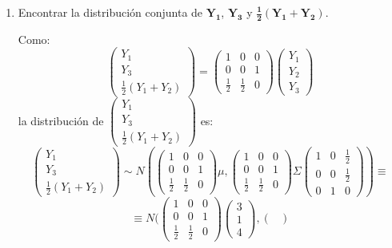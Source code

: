 \documentclass[11pt,a4paper]{article}
\begin{document}
\begin{enumerate}[label=\arabic*.]
\begin{enumerate}[label=\arabic*)]
\bfseries
\vspace{1cm}
\item Encontrar la distribución conjunta de $\mathbf{Y_{1}}$, $\mathbf{Y_{3}}$ y $\mathbf{\frac{1}{2}(Y_{1} + Y_{2})}$.
\vspace{0.5cm}
\normalfont

Como:
$$\begin{pmatrix} Y_{1} \\ Y_{3} \\ \frac{1}{2}(Y_{1} + Y_{2}) \end{pmatrix} = \begin{pmatrix}
1 & 0 & 0 \\
0 & 0 & 1 \\
\frac{1}{2} & \frac{1}{2} & 0
\end{pmatrix} \begin{pmatrix} Y_{1} \\ Y_{2} \\ Y_{3} \end{pmatrix}$$
la distribución de $\begin{pmatrix} Y_{1} \\ Y_{3} \\ \frac{1}{2}(Y_{1} + Y_{2}) \end{pmatrix}$ es:
$$\begin{pmatrix} Y_{1} \\ Y_{3} \\ \frac{1}{2}(Y_{1} + Y_{2}) \end{pmatrix} \sim N(\begin{pmatrix}
1 & 0 & 0 \\
0 & 0 & 1 \\
\frac{1}{2} & \frac{1}{2} & 0
\end{pmatrix} \mu, \begin{pmatrix}
1 & 0 & 0 \\
0 & 0 & 1 \\
\frac{1}{2} & \frac{1}{2} & 0
\end{pmatrix} \Sigma \begin{pmatrix}
1 & 0 & \frac{1}{2} \\
0 & 0 & \frac{1}{2} \\
0 & 1 & 0
\end{pmatrix}) \equiv$$
$$\equiv N(\begin{pmatrix}
1 & 0 & 0 \\
0 & 0 & 1 \\
\frac{1}{2} & \frac{1}{2} & 0
\end{pmatrix} \begin{pmatrix} 3 \\ 1 \\ 4 \end{pmatrix}, \begin{pmatrix}

\end{pmatrix}$$
\end{enumerate}
\end{enumerate}
\end{document}
